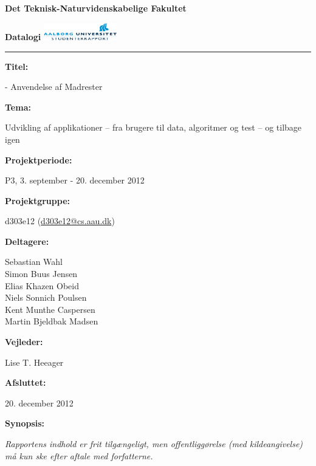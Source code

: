 \begin{nopagebreak}
\LARGE{\textbf{Det Teknisk-Naturvidenskabelige Fakultet}}\vspace{-0.9cm}

\large{\textbf{Datalogi}}
\hspace{10.5cm}\includegraphics[height=0.75cm]{billeder/aau_logo.pdf}


\hrule

\newcommand{\titleitem}[2]{\textbf{#1:}

\hspace*{0.5cm}
\begin{minipage}{0.9\columnwidth}#2\end{minipage}
\vspace{0.25cm}}
\begin{multicols}{2}

\titleitem{Titel}{{\Foodl} - Anvendelse af Madrester}

\titleitem{Tema}{Udvikling af applikationer – fra brugere til data, algoritmer og test – og tilbage igen}

\titleitem{Projektperiode}{P3, 3. september - 20. december 2012}

\titleitem{Projektgruppe}{d303e12 (\url{d303e12@cs.aau.dk})}

\titleitem{Deltagere}{
    Sebastian Wahl\\
    Simon Buus Jensen\\
    Elias Khazen Obeid\\
    Niels Sonnich Poulsen\\
    Kent Munthe Caspersen\\
    Martin Bjeldbak Madsen
}

\titleitem{Vejleder}{Lise T. Heeager}

\titleitem{Afsluttet}{20. december 2012}

\vfill
\columnbreak

\titleitem{Synopsis}{  }

\end{multicols}
\centering
\textit{Rapportens indhold er frit tilgængeligt, men offentliggørelse (med kildeangivelse) må kun ske efter aftale med
forfatterne.}

\end{nopagebreak}
